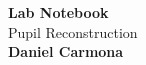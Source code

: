 \begin{titlepage}
    \begin{center}
    {\fontsize{40}{48}\selectfont \bfseries Lab Notebook} 
    \\\vspace{20pt}
    {\LARGE Pupil Reconstruction} \\
    \vspace{20pt}
    \textbf{Daniel Carmona}
    \vspace{8pt}
    \end{center}
    
\end{titlepage}